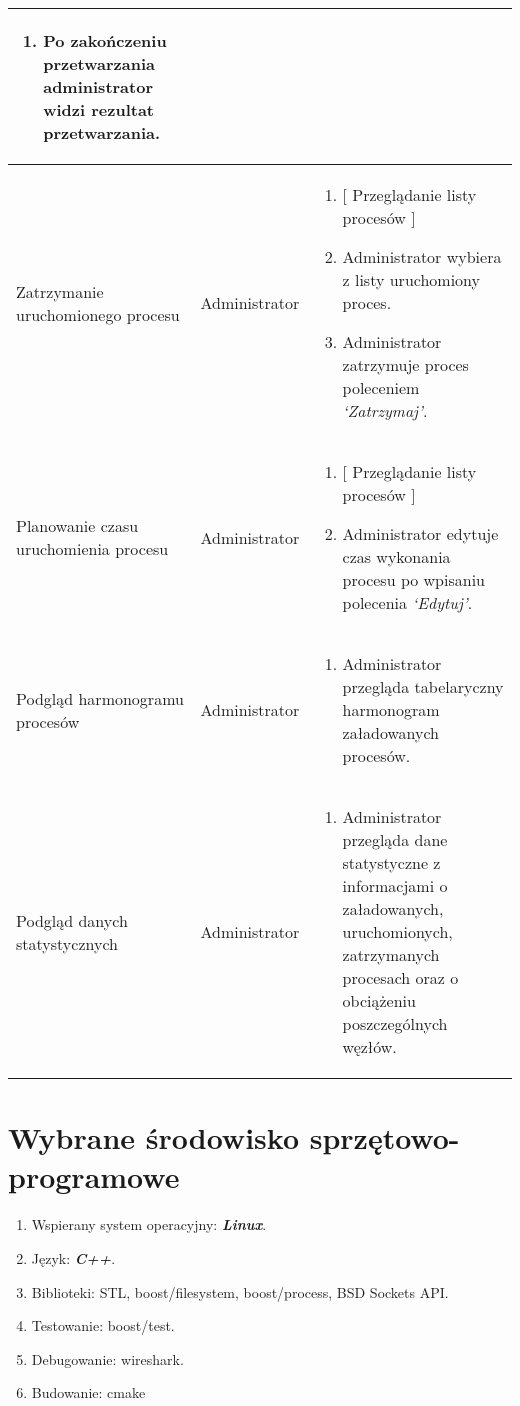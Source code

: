 \documentclass[paper=a4, fontsize=11pt]{scrartcl} %
\begin{document}
\begin{longtable}{ |m{4.5cm}|m{3cm}|m{7.5cm}|}
\begin{enumerate}
\item Po zakończeniu przetwarzania administrator widzi rezultat przetwarzania.
\end{enumerate} \\
 \hline
Zatrzymanie uruchomionego procesu & Administrator & 
\begin{enumerate}
\item $[$ Przeglądanie listy procesów $]$
\item Administrator wybiera z listy uruchomiony proces.
\item Administrator zatrzymuje proces poleceniem \textit{‘Zatrzymaj’}.
\end{enumerate} \\
 \hline
Planowanie czasu uruchomienia procesu & Administrator & 
\begin{enumerate}
\item $[$ Przeglądanie listy procesów $]$
\item Administrator edytuje czas wykonania procesu po wpisaniu polecenia \textit{‘Edytuj’}.
\end{enumerate} \\
 \hline
Podgląd harmonogramu procesów & Administrator & 
\begin{enumerate}
\item Administrator przegląda tabelaryczny harmonogram załadowanych procesów.
\end{enumerate} \\
 \hline
Podgląd danych statystycznych & Administrator & 
\begin{enumerate}
\item Administrator przegląda dane statystyczne z informacjami o załadowanych, uruchomionych, zatrzymanych procesach oraz o obciążeniu poszczególnych węzłów.
\end{enumerate} \\
 \hline
\end{longtable}

\section*{Wybrane środowisko sprzętowo-programowe} 
\begin{enumerate}
\item Wspierany system operacyjny: \textit{\textbf{Linux}}.
\item Język: \textit{\textbf{C++}}.
\item Biblioteki: STL, boost/filesystem, boost/process, BSD Sockets API.
\item Testowanie: boost/test.
\item Debugowanie: wireshark.
\item Budowanie: cmake
\end{enumerate}
\end{document}
